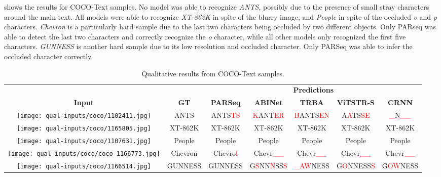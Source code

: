  shows the results for COCO-Text samples. No model was able to recognize \textit{ANTS}, possibly due to the presence of small stray characters around the main text. All models were able to recognize \textit{XT-862K} in spite of the blurry image, and \textit{People} in spite of the occluded \textit{o} and \textit{p} characters. \textit{Chevron} is a particularly hard sample due to the last two characters being occluded by two different objects. Only PARseq was able to detect the last two characters and correctly recognize the \textit{o} character, while all other models only recognized the first five characters. \textit{GUNNESS} is another hard sample due to its low resolution and occluded character. Only PARSeq was able to infer the occluded character correctly.

\begin{table*}[htb]
  \centering
  \scriptsize
  \setlength\tabcolsep{3pt}
  \caption{Qualitative results from COCO-Text samples.}
  \begin{tabular}{ c c c c c c c }
    \toprule
    & & \multicolumn{5}{c}{\textbf{Predictions}} \\
    \cmidrule{3-7}
    \textbf{Input} & \textbf{GT} & \textbf{PARSeq} & \textbf{ABINet} & \textbf{TRBA} & \textbf{ViTSTR-S} & \textbf{CRNN} \\
    \midrule
    \texttt{[image: qual-inputs/coco/1102411.jpg]} & ANTS & ANTS\textcolor{red}{TS} & \textcolor{red}{K}ANT\textcolor{red}{ER} & \textcolor{red}{B}ANTS\textcolor{red}{EN} & A\textcolor{red}{A}TS\textcolor{red}{SE} & 
    \textcolor{red}{\_}N\textcolor{red}{\_\_} \\
    \texttt{[image: qual-inputs/coco/1165805.jpg]} & XT-862K & XT-862K & XT-862K & XT-862K & XT-862K & XT-862K \\
    \texttt{[image: qual-inputs/coco/1107631.jpg]} & People & People & People & People & People & People \\
    \texttt{[image: qual-inputs/coco/coco-1166773.jpg]} & Chevron & Chevro\textcolor{red}{l} & Chevr\textcolor{red}{\_\_} & Chevr\textcolor{red}{\_\_} & Chevr\textcolor{red}{\_\_} & Chevr\textcolor{red}{\_\_} \\
    \texttt{[image: qual-inputs/coco/1166514.jpg]} & GUNNESS & GUNNESS & G\textcolor{red}{S}NN\textcolor{red}{N}SS\textcolor{red}{S} & \textcolor{red}{\_AW}NESS & G\textcolor{red}{O}NNESS\textcolor{red}{S} & G\textcolor{red}{OW}NESS \\
    \bottomrule
  \end{tabular}
  \label{tab:qual-results-coco}
\end{table*}

